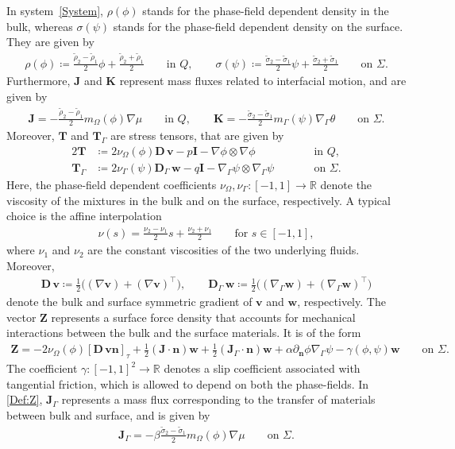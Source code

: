\documentclass[10pt,reqno]{amsart}
\theoremstyle{remark}
\numberwithin{equation}{section}
\newcommand{\R}{\mathbb R}
\newcommand{\n}{\mathbf{n}}
\newcommand{\bv}{\mathbf{v}}
\newcommand{\bw}{\mathbf{w}}
\newcommand{\J}{\mathbf{J}}
\newcommand{\K}{\mathbf{K}}
\newcommand{\T}{\mathbf{T}}
\newcommand{\I}{\mathbf{I}}
\newcommand{\D}{\mathbf{D}}
\newcommand{\Dg}{\mathbf{D}_\Gamma}
\newcommand{\Z}{\mathbf{Z}}
\newcommand{\deln}{\partial_\n}
\newcommand{\Grad}{\nabla}
\newcommand{\Gradg}{\nabla_\Ga}
\newcommand{\Om}{\Omega}
\newcommand{\Ga}{\Gamma}
\begin{document}
In system~\eqref{System}, $\rho(\phi)$ stands for the phase-field dependent density in the bulk, whereas $\sigma(\psi)$ stands for the phase-field dependent density on the surface. They are given by
\begin{align*}
    \rho(\phi) \coloneqq \frac{\tilde\rho_2 - \tilde\rho_1}{2}\phi + \frac{\tilde\rho_2 + \tilde\rho_1}{2} \qquad\text{in~}Q, \qquad \sigma(\psi) \coloneqq \frac{\tilde\sigma_2 - \tilde\sigma_1}{2}\psi + \frac{\tilde\sigma_2 + \tilde\sigma_1}{2} \qquad\text{on~}\Sigma.
\end{align*}
Furthermore, $\J$ and $\K$ represent mass fluxes related to interfacial motion, and are given by
\begin{align*}
    \J = - \frac{\tilde\rho_2 - \tilde\rho_1}{2}m_\Om(\phi)\Grad\mu \qquad\text{in~}Q, \qquad \K = - \frac{\tilde\sigma_2 - \tilde\sigma_1}{2}m_\Ga(\psi)\Gradg\theta \qquad\text{on~}\Sigma.
\end{align*}
Moreover, $\T$ and $\T_\Ga$ are stress tensors, that are given by
\begin{alignat*}{2}
    \T &\coloneqq 2\nu_\Om(\phi)\D\,\bv - p\I - \Grad\phi\otimes\Grad\phi &&\qquad\text{in~}Q, \\
    \T_\Ga &\coloneqq 2\nu_\Ga(\psi)\Dg\,\bw - q\I - \Gradg\psi\otimes\Gradg\psi &&\qquad\text{on~}\Sigma.
\end{alignat*}
Here, the phase-field dependent coefficients $\nu_\Om, \nu_\Ga:[-1,1]\rightarrow\R$ denote the viscosity of the mixtures in the bulk and on the surface, respectively. A typical choice is the affine interpolation
\begin{align*}
    \nu(s) = \frac{\nu_2 - \nu_1}{2}s + \frac{\nu_2 + \nu_1}{2} \qquad\text{for~}s\in[-1,1],
\end{align*}
where $\nu_1$ and $\nu_2$ are the constant viscosities of the two underlying fluids. Moreover, 
\begin{align*}
    \D\,\bv \coloneqq \frac12\big((\Grad\bv) + (\Grad\bv)^\top\big), \qquad \Dg\,\bw \coloneqq \frac12\big((\Gradg\bw) + (\Gradg\bw)^\top\big)
\end{align*}
denote the bulk and surface symmetric gradient of $\bv$ and $\bw$, respectively.
The vector $\Z$ represents a surface force density that accounts for mechanical interactions between the bulk and the surface materials. It is of the form
\begin{align}\label{Def:Z}
    \Z = -2\nu_\Om(\phi)[\D\,\bv\n]_\tau + \tfrac12(\J\cdot\n)\bw + \tfrac12(\J_\Ga\cdot\n)\bw + \alpha\deln\phi\Gradg\psi - \gamma(\phi,\psi)\bw \qquad\text{on~}\Sigma.
\end{align}
The coefficient $\gamma:[-1,1]^2\rightarrow\R$ denotes a slip coefficient associated with tangential friction, which is allowed to depend on both the phase-fields. In \eqref{Def:Z}, $\J_\Ga$ represents a mass flux corresponding to the transfer of materials between bulk and surface, and is given by
\begin{align*}
    \J_\Ga = -\beta\frac{\tilde\sigma_2 - \tilde\sigma_1}{2}m_\Om(\phi)\Grad\mu \qquad\text{on~}\Sigma.
\end{align*}
\end{document}
